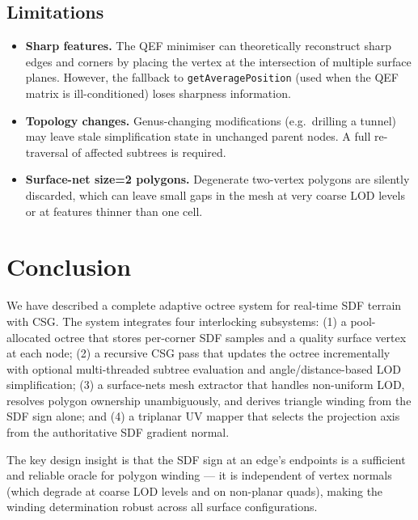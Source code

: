 \documentclass[10pt,a4paper]{article}
\begin{document}
\subsection{Limitations}

\begin{itemize}
  \item \textbf{Sharp features.} The QEF minimiser can theoretically
    reconstruct sharp edges and corners by placing the vertex at the
    intersection of multiple surface planes.  However, the fallback to
    \lstinline{getAveragePosition} (used when the QEF matrix is
    ill-conditioned) loses sharpness information.
  \item \textbf{Topology changes.} Genus-changing modifications (e.g.\
    drilling a tunnel) may leave stale simplification state in unchanged
    parent nodes.  A full re-traversal of affected subtrees is required.
  \item \textbf{Surface-net size=2 polygons.} Degenerate two-vertex
    polygons are silently discarded, which can leave small gaps in the
    mesh at very coarse LOD levels or at features thinner than one cell.
\end{itemize}

\section{Conclusion}
\label{sec:conclusion}

We have described a complete adaptive octree system for real-time SDF
terrain with CSG.  The system integrates four interlocking subsystems:
(1) a pool-allocated octree that stores per-corner SDF samples and a
quality surface vertex at each node; (2) a recursive CSG pass that
updates the octree incrementally with optional multi-threaded subtree
evaluation and angle/distance-based LOD simplification; (3) a surface-nets
mesh extractor that handles non-uniform LOD, resolves polygon ownership
unambiguously, and derives triangle winding from the SDF sign alone; and
(4) a triplanar UV mapper that selects the projection axis from the
authoritative SDF gradient normal.

The key design insight is that the SDF sign at an edge's endpoints is a
sufficient and reliable oracle for polygon winding — it is independent of
vertex normals (which degrade at coarse LOD levels and on non-planar
quads), making the winding determination robust across all surface
configurations.
\end{document}
